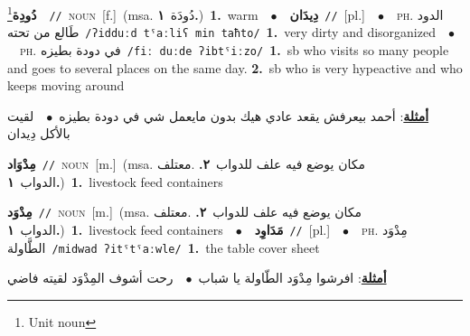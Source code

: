 \documentclass[10pt,a4paper,twoside]{article} %
\begin{document}
\begin{multicols}{2}
{\setlength\topsep{0pt}\textbf{\foreignlanguage{arabic}{دُودِة}}\footnote{Unit noun}\ \ {\color{gray}\texttt{//}\color{black}}\ \textsc{noun}\ [f.]\ \color{gray}(msa. \foreignlanguage{arabic}{دُودَة}~\foreignlanguage{arabic}{\textbf{١.}})\color{black}\ \textbf{1.}~warm\ \ $\bullet$\ \ \setlength\topsep{0pt}\textbf{\foreignlanguage{arabic}{دِيدَان}}\ {\color{gray}\texttt{//}\color{black}}\ [pl.]\ \ $\bullet$\ \ \textsc{ph.} \color{gray} \foreignlanguage{arabic}{الدود طَالع من تحته}\color{black}\ {\color{gray}\texttt{/{\sffamily ʔidduːd tˤaːliʕ min taħto}/}\color{black}}\ \textbf{1.}~very dirty and disorganized\ \ $\bullet$\ \ \textsc{ph.} \color{gray} \foreignlanguage{arabic}{في دودة بطيزه}\color{black}\ {\color{gray}\texttt{/{\sffamily fiː duːde ʔibtˤiːzo}/}\color{black}}\ \textbf{1.}~sb who visits so many people and goes to several places on the same day.  \textbf{2.}~sb who is very hypeactive and who keeps moving around\  \begin{flushright}\color{gray}\foreignlanguage{arabic}{\textbf{\underline{\foreignlanguage{arabic}{أمثلة}}}: أحمد بيعرفش يقعد عادي هيك بدون مايعمل شي في دودة بطيزه\ $\bullet$\ \  لقيت بالأكل دِيدان}\end{flushright}\color{black}} \vspace{2mm}

{\setlength\topsep{0pt}\textbf{\foreignlanguage{arabic}{مِدْوَاد}}\ {\color{gray}\texttt{//}\color{black}}\ \textsc{noun}\ [m.]\ \color{gray}(msa. \foreignlanguage{arabic}{مكان يوضع فيه علف للدواب}~\foreignlanguage{arabic}{\textbf{٢.}}  .\foreignlanguage{arabic}{معتلف الدواب}~\foreignlanguage{arabic}{\textbf{١.}})\color{black}\ \textbf{1.}~livestock feed containers\ } \vspace{2mm}

{\setlength\topsep{0pt}\textbf{\foreignlanguage{arabic}{مِدْوَد}}\ {\color{gray}\texttt{//}\color{black}}\ \textsc{noun}\ [m.]\ \color{gray}(msa. \foreignlanguage{arabic}{مكان يوضع فيه علف للدواب}~\foreignlanguage{arabic}{\textbf{٢.}}  .\foreignlanguage{arabic}{معتلف الدواب}~\foreignlanguage{arabic}{\textbf{١.}})\color{black}\ \textbf{1.}~livestock feed containers\ \ $\bullet$\ \ \setlength\topsep{0pt}\textbf{\foreignlanguage{arabic}{مَدَاوِد}}\ {\color{gray}\texttt{//}\color{black}}\ [pl.]\ \ $\bullet$\ \ \textsc{ph.} \color{gray} \foreignlanguage{arabic}{مِدْوَد الطَّاولة}\color{black}\ {\color{gray}\texttt{/{\sffamily midwad ʔitˤtˤaːwle}/}\color{black}}\ \textbf{1.}~the table cover sheet\  \begin{flushright}\color{gray}\foreignlanguage{arabic}{\textbf{\underline{\foreignlanguage{arabic}{أمثلة}}}: افرشوا مِدْوَد الطّاولة يا شباب\ $\bullet$\ \  رحت أشوف المِدْوَد  لقيته فاضي}\end{flushright}\color{black}} \vspace{2mm}


\end{multicols}
\end{document}
